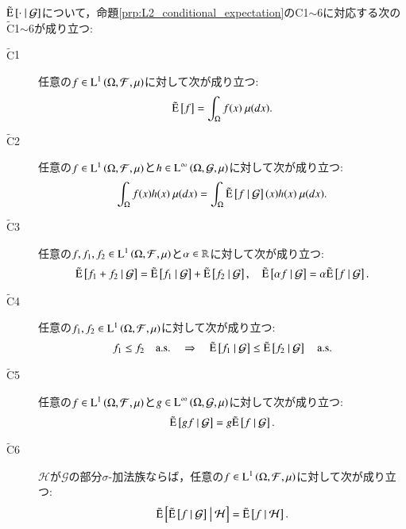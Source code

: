 	\begin{itembox}[l]{}
		\begin{prp}[拡張された条件付き期待値作用素の性質]
		$\tilde{\operatorname{E}} \left[ \cdot \ \middle|\ \mathcal{G} \right]$について，命題\ref{prp:L2_conditional_expectation}のC1$\sim$6に対応する次の$\tilde{\mathrm{C}}$1$\sim$6が成り立つ:
		\begin{description}
			\item[$\tilde{\mathrm{C}}$1] 任意の$f \in \operatorname{L}^{1} \left(\Omega, \mathcal{F},\mu\right)$に対して次が成り立つ:
				\begin{align}
					\tilde{\operatorname{E}} \left[ f \right] = \int_{\Omega} f(x)\ \mu(dx).
				\end{align}
				
			\item[$\tilde{\mathrm{C}}$2]	任意の$f \in \operatorname{L}^{1} \left(\Omega, \mathcal{F},\mu\right)$と$h \in \operatorname{L}^{\infty} \left(\Omega, \mathcal{G},\mu\right)$に対して次が成り立つ:
				\begin{align}
					\int_{\Omega} f(x)h(x)\ \mu(dx) = \int_{\Omega} \tilde{\operatorname{E}} \left[ f \ \middle|\ \mathcal{G} \right](x)h(x)\ \mu(dx).
				\end{align}
				
			\item[$\tilde{\mathrm{C}}$3]	任意の$f,f_1,f_2 \in \operatorname{L}^{1} \left(\Omega, \mathcal{F},\mu\right)$と$\alpha \in \mathbb{R}$に対して次が成り立つ:
				\begin{align}
					\tilde{\operatorname{E}} \left[ f_1 + f_2 \ \middle|\ \mathcal{G} \right] = \tilde{\operatorname{E}} \left[ f_1 \ \middle|\ \mathcal{G} \right] + \tilde{\operatorname{E}} \left[ f_2 \ \middle|\ \mathcal{G} \right],
					\quad \tilde{\operatorname{E}} \left[ \alpha f \ \middle|\ \mathcal{G} \right] = \alpha \tilde{\operatorname{E}} \left[ f \ \middle|\ \mathcal{G} \right].
				\end{align}

			\item[$\tilde{\mathrm{C}}$4]	任意の$f_1,f_2 \in \operatorname{L}^{1} \left(\Omega, \mathcal{F},\mu\right)$に対して次が成り立つ:
				\begin{align}
					f_1 \leq f_2 \quad \mathrm{a.s.} \quad \Rightarrow \quad \tilde{\operatorname{E}} \left[ f_1 \ \middle|\ \mathcal{G} \right] \leq \tilde{\operatorname{E}} \left[ f_2 \ \middle|\ \mathcal{G} \right] \quad \mathrm{a.s.}
				\end{align}
			
			\item[$\tilde{\mathrm{C}}$5]	任意の$f \in \operatorname{L}^{1} \left(\Omega, \mathcal{F},\mu\right)$と$g \in \operatorname{L}^{\infty} \left(\Omega, \mathcal{G},\mu\right)$に対して次が成り立つ:
				\begin{align}
					\tilde{\operatorname{E}} \left[ gf \ \middle|\ \mathcal{G} \right] = g\tilde{\operatorname{E}} \left[ f \ \middle|\ \mathcal{G} \right].
				\end{align}
			
			\item[$\tilde{\mathrm{C}}$6]	$\mathcal{H}$が$\mathcal{G}$の部分$\sigma$-加法族ならば，任意の$f \in \operatorname{L}^{1} \left(\Omega, \mathcal{F},\mu\right)$に対して次が成り立つ:
				\begin{align}
					\tilde{\operatorname{E}} \left[ \tilde{\operatorname{E}} \left[ f \ \middle|\ \mathcal{G} \right] \ \middle|\ \mathcal{H} \right] = \tilde{\operatorname{E}} \left[ f \ \middle|\ \mathcal{H} \right].
				\end{align}
		\end{description}
		\label{prp:properties_of_expanded_conditional_expectation}
		\end{prp}
	\end{itembox}
	
